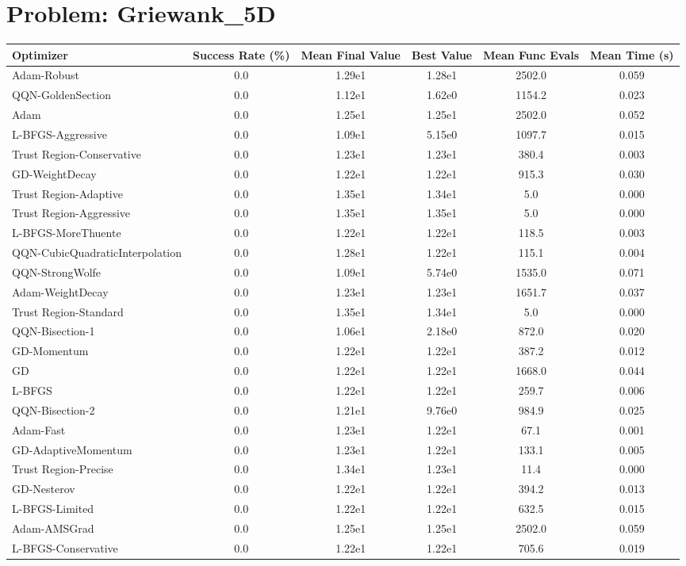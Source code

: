 \documentclass{article}
\begin{document}
\section{Problem: Griewank\_5D}
\begin{longtable}{p{3cm}*{5}{c}}
\toprule
\textbf{Optimizer} & \textbf{Success Rate (\%)} & \textbf{Mean Final Value} & \textbf{Best Value} & \textbf{Mean Func Evals} & \textbf{Mean Time (s)} \\
\midrule
Adam-Robust & 0.0 & 1.29e1 & 1.28e1 & 2502.0 & 0.059 \\
QQN-GoldenSection & 0.0 & 1.12e1 & 1.62e0 & 1154.2 & 0.023 \\
Adam & 0.0 & 1.25e1 & 1.25e1 & 2502.0 & 0.052 \\
L-BFGS-Aggressive & 0.0 & 1.09e1 & 5.15e0 & 1097.7 & 0.015 \\
Trust Region-Conservative & 0.0 & 1.23e1 & 1.23e1 & 380.4 & 0.003 \\
GD-WeightDecay & 0.0 & 1.22e1 & 1.22e1 & 915.3 & 0.030 \\
Trust Region-Adaptive & 0.0 & 1.35e1 & 1.34e1 & 5.0 & 0.000 \\
Trust Region-Aggressive & 0.0 & 1.35e1 & 1.35e1 & 5.0 & 0.000 \\
L-BFGS-MoreThuente & 0.0 & 1.22e1 & 1.22e1 & 118.5 & 0.003 \\
QQN-CubicQuadraticInterpolation & 0.0 & 1.28e1 & 1.22e1 & 115.1 & 0.004 \\
QQN-StrongWolfe & 0.0 & 1.09e1 & 5.74e0 & 1535.0 & 0.071 \\
Adam-WeightDecay & 0.0 & 1.23e1 & 1.23e1 & 1651.7 & 0.037 \\
Trust Region-Standard & 0.0 & 1.35e1 & 1.34e1 & 5.0 & 0.000 \\
QQN-Bisection-1 & 0.0 & 1.06e1 & 2.18e0 & 872.0 & 0.020 \\
GD-Momentum & 0.0 & 1.22e1 & 1.22e1 & 387.2 & 0.012 \\
GD & 0.0 & 1.22e1 & 1.22e1 & 1668.0 & 0.044 \\
L-BFGS & 0.0 & 1.22e1 & 1.22e1 & 259.7 & 0.006 \\
QQN-Bisection-2 & 0.0 & 1.21e1 & 9.76e0 & 984.9 & 0.025 \\
Adam-Fast & 0.0 & 1.23e1 & 1.22e1 & 67.1 & 0.001 \\
GD-AdaptiveMomentum & 0.0 & 1.23e1 & 1.22e1 & 133.1 & 0.005 \\
Trust Region-Precise & 0.0 & 1.34e1 & 1.23e1 & 11.4 & 0.000 \\
GD-Nesterov & 0.0 & 1.22e1 & 1.22e1 & 394.2 & 0.013 \\
L-BFGS-Limited & 0.0 & 1.22e1 & 1.22e1 & 632.5 & 0.015 \\
Adam-AMSGrad & 0.0 & 1.25e1 & 1.25e1 & 2502.0 & 0.059 \\
L-BFGS-Conservative & 0.0 & 1.22e1 & 1.22e1 & 705.6 & 0.019 \\
\bottomrule
\end{longtable}
\end{document}
